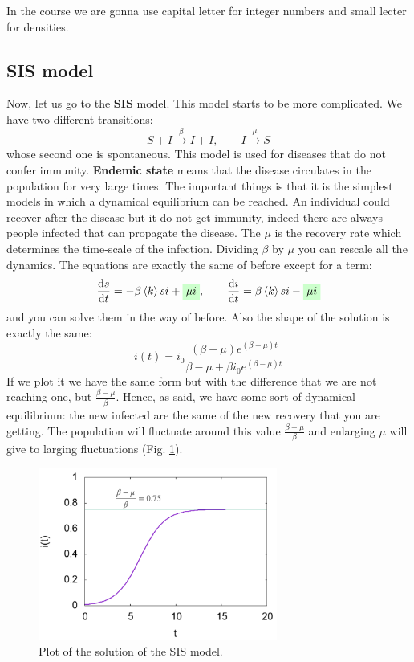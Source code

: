 \documentclass[../main/main.tex]{subfiles}
\begin{document}
\begin{remark}
In the course we are gonna use capital letter for integer numbers and small lecter for densities.
\end{remark}

\subsection{SIS model}
Now, let us go to the \textbf{SIS} model. This model starts to be more complicated. We have two different transitions:
\begin{equation*}
  S + I \overset{\beta }{\rightarrow } I + I, \qquad I \overset{\mu }{\rightarrow } S
\end{equation*}
whose second one is spontaneous.
This model is used for diseases that do not confer immunity. \textbf{Endemic state} means that the disease circulates in the population for very large times.
The important things is that it is the simplest models in which a dynamical equilibrium can be reached. An individual could recover after the disease but it do not get immunity, indeed there are always people infected that can propagate the disease. The \( \mu  \) is the recovery rate which determines the time-scale of the infection.
Dividing \( \beta  \) by \( \mu  \) you can rescale all the dynamics.
The equations are exactly the same of before except for a term:
\begin{equation*}
  \dv{s}{t} = - \beta \expval{k} si + \mathcolorbox{green!20}{\mu i}, \qquad \dv{i}{t} = \beta \expval{k} si - \mathcolorbox{green!20}{\mu i}
\end{equation*}
and you can solve them in the way of before.
Also the shape of the solution is exactly the same:
\begin{equation*}
  i(t) = i_0 \frac{(\beta - \mu ) e^{(\beta - \mu )t} }{\beta - \mu  + \beta i_0 e^{(\beta - \mu )t} }
\end{equation*}
If we plot it we have the same form but with the difference that we are not reaching one, but \( \frac{\beta - \mu }{\beta } \). Hence, as said, we have some sort of dynamical equilibrium: the new infected are the same of the new recovery that you are getting. The population will fluctuate around this value \( \frac{\beta - \mu }{\beta } \) and enlarging \( \mu  \) will give to larging fluctuations (Fig. \ref{fig:3_3}).
\begin{figure}[h!]
\centering
\includegraphics[width=0.7\textwidth]{../lessons/image/03/3.png}
\caption{\label{fig:3_3} Plot of the solution of the SIS model.}
\end{figure}
\end{document}
